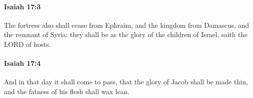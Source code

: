		\paragraph{Isaiah 17:3} %
			\label{ISAIAH-17-3}

			The fortress also shall cease from Ephraim, and the kingdom from Damascus, and the remnant of Syria: they shall be as the glory of the children of Israel, saith the LORD of hosts.


		\paragraph{Isaiah 17:4} %
			\label{ISAIAH-17-4}

			And in that day it shall come to pass, that the glory of Jacob shall be made thin, and the fatness of his flesh shall wax lean.


